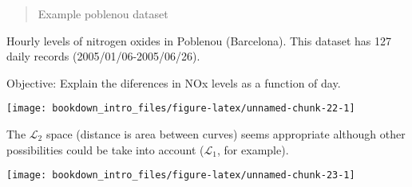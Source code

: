 \documentclass[
]{book}
\newenvironment{Shaded}{\begin{snugshade}}{\end{snugshade}}
\newcommand{\AttributeTok}[1]{\textcolor[rgb]{0.77,0.63,0.00}{#1}}
\newcommand{\DecValTok}[1]{\textcolor[rgb]{0.00,0.00,0.81}{#1}}
\newcommand{\FunctionTok}[1]{\textcolor[rgb]{0.00,0.00,0.00}{#1}}
\newcommand{\NormalTok}[1]{#1}
\newcommand{\OtherTok}[1]{\textcolor[rgb]{0.56,0.35,0.01}{#1}}
\newcommand{\SpecialCharTok}[1]{\textcolor[rgb]{0.00,0.00,0.00}{#1}}
\begin{document}
\begin{quote}
Example poblenou dataset
\end{quote}

Hourly levels of nitrogen oxides in Poblenou (Barcelona). This dataset has 127 daily records (2005/01/06-2005/06/26).

Objective: Explain the diferences in NOx levels as a function of day.

\begin{Shaded}
\end{Shaded}

\begin{center}\texttt{[image: bookdown\_intro\_files/figure-latex/unnamed-chunk-22-1]} \end{center}

The \(\mathcal{L}_2\) space (distance is area between curves) seems appropriate although other possibilities could be take into account (\(\mathcal{L}_1\), for example).

\begin{Shaded}
\end{Shaded}

\begin{center}\texttt{[image: bookdown\_intro\_files/figure-latex/unnamed-chunk-23-1]} \end{center}
\end{document}
